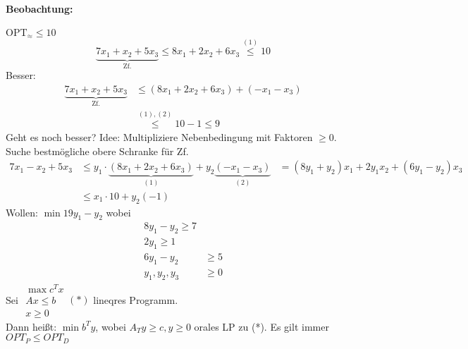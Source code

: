 \paragraph*{Beobachtung:} $\text{OPT}_\approx \leq 10$
\[\underbrace{7x_1 + x_2 + 5x_3}_{\text{Zf.}} \leq 8x_1 + 2x_2 + 6x_3 \overset{(1)}{\leq} 10\]
Besser:
\begin{align*}
 \underbrace{7x_1 + x_2 + 5x_3}_{\text{Zf.}} &\leq (8x_1 + 2x_2 + 6x_3) + (-x_1 - x_3) \\
         &\overset{(1),(2)}{\leq} 10 - 1 \leq 9
\end{align*}
Geht es noch besser? Idee: Multipliziere Nebenbedingung mit Faktoren $\geq 0$. Suche bestmögliche obere Schranke für Zf.
\begin{align*}
 7x_1 - x_2 + 5x_3 &\leq y_1 \cdot \underbrace{(8x_1 + 2x_2 + 6x_3)}_{(1)} + y_2\underbrace{(-x_1 - x_3)}_{(2)}
     &= (8y_1 + y_2)x_1 + 2y_1x_2 + (6y_1 - y_2) x_3 \\
     &\leq x_1 \cdot 10 + y_2 (-1)
\end{align*}
Wollen: $\min 19y_1 - y_2$ wobei
\begin{align*}
 8y_1 - y_2 \geq 7 \\
 2y_1 \geq 1 \\
 6y_1 - y_2 &\geq 5 \\
 y_1, y_2, y_3 &\geq 0
\end{align*}
\Defi Sei $\begin{matrix}\max c^T x \\ Ax \leq b \\ x \geq 0\end{matrix} (*)$ lineqres Programm. \\
Dann heißt: $\min b^Ty$, wobei $A_Ty \geq c, y \geq 0$ orales LP zu (*).
\Lemma Es gilt immer $OPT_P \leq OPT_D$
